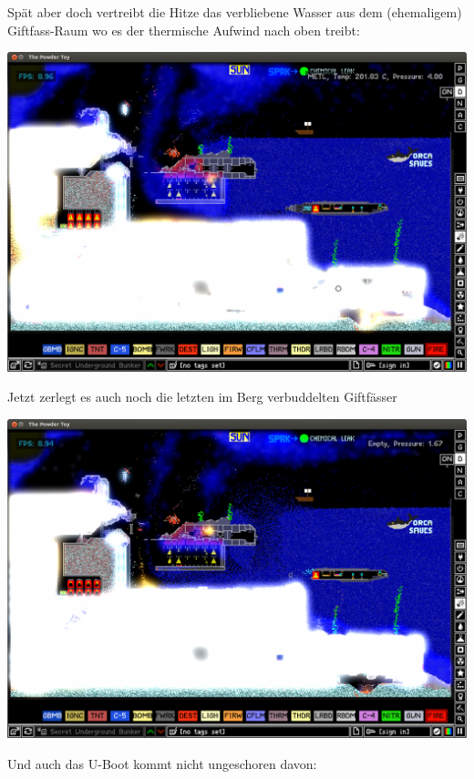 \begin{multicols}{2}
\begin{center}
\end{center}
Spät aber doch vertreibt die Hitze das verbliebene Wasser aus dem (ehemaligem) Giftfass-Raum wo es der thermische Aufwind nach oben treibt:
\begin{center}
\includegraphics[width=\linewidth]{powdertoy/powdertoy-bu10.png}
\end{center}
Jetzt zerlegt es auch noch die letzten im Berg verbuddelten Giftfässer
\begin{center}
\includegraphics[width=\linewidth]{powdertoy/powdertoy-bu12.png}
\end{center}
Und auch das U-Boot kommt nicht ungeschoren davon:
\begin{center}

\end{center}
\end{multicols}
